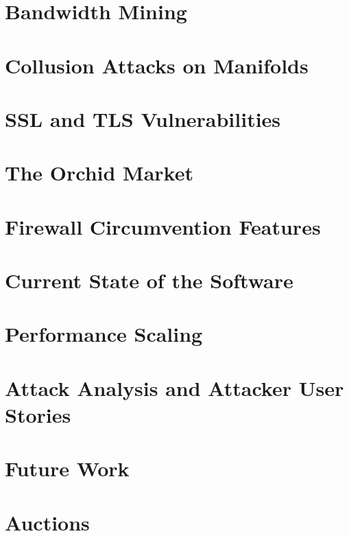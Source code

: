 \documentclass{article}
\newcommand{\orchid}{Orchid}
\newcommand{\Orchid}{\orchid}
\newcommand{\TOM}{The \Orchid{} Market}
\begin{document}
\section{Bandwidth Mining}
\label{sec:mining}


\section{Collusion Attacks on Manifolds}
\label{sec:collusion-attacks}


\section{SSL and TLS Vulnerabilities}


\section{\TOM{}}
\label{sec:agora}


\section{Firewall Circumvention Features}
\label{sec:evasion}


\section{Current State of the Software}
\label{sec:current}


\section{Performance Scaling}
\label{sec:performance}


\section{Attack Analysis and Attacker User Stories}
\label{sec:attack-stories}


\section{Future Work}
\label{sec:future}


\newpage

\printbibliography

\newpage

\appendix

\section{Auctions}
\label{sec:auctions}

\end{document}
